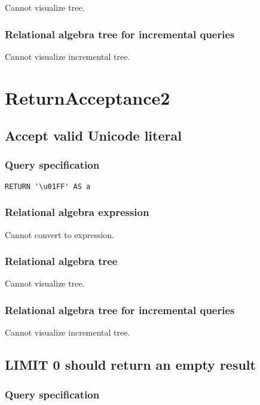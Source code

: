 Cannot visualize tree.

\subsubsection*{Relational algebra tree for incremental queries}

Cannot visualize incremental tree.

\section{ReturnAcceptance2}

\subsection{Accept valid Unicode literal}

\subsubsection*{Query specification}

\begin{lstlisting}
RETURN '\u01FF' AS a
\end{lstlisting}

\subsubsection*{Relational algebra expression}

Cannot convert to expression.

\subsubsection*{Relational algebra tree}

Cannot visualize tree.

\subsubsection*{Relational algebra tree for incremental queries}

Cannot visualize incremental tree.

\subsection{LIMIT 0 should return an empty result}

\subsubsection*{Query specification}

